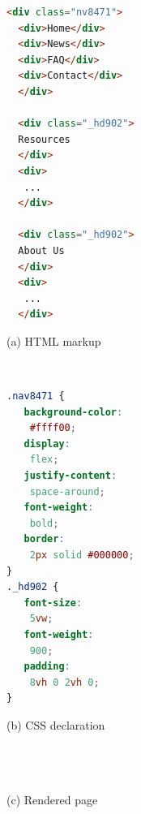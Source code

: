\begin{figure}%
	\centering
    \noindent
    \begin{minipage}[c]{.4\textwidth}
        \centering
        \begin{lstlisting}[language={html},frame=ltbr,
            aboveskip=1.0em]
  <div class="nv8471">
  <div>Home</div>
  <div>News</div>
  <div>FAQ</div>
  <div>Contact</div>
  </div>
        
  <div class="_hd902">
  Resources
  </div>
  <div>
   ...
  </div>
  
  <div class="_hd902">
  About Us
  </div>
  <div>
   ...
  </div>
        \end{lstlisting}
    	(a) HTML markup
    \end{minipage}
\  \  \  \  \  \ 
    \begin{minipage}[c]{.45\textwidth}
        \centering
        \begin{lstlisting}[language={CSS},frame=ltbr,
            aboveskip=1.0em]
.nav8471 {
   background-color:
    #ffff00;
   display:
    flex;
   justify-content:
    space-around;
   font-weight:
    bold;
   border:
    2px solid #000000;
}
._hd902 {
   font-size:
    5vw;
   font-weight:
    900;
   padding:
    8vh 0 2vh 0;
}
        \end{lstlisting}
    	(b) CSS declaration
    \end{minipage}
    \begin{minipage}[c]{.85\textwidth}
        \centering
        \ \\ \ \\ 
        \\ (c) Rendered page
    \end{minipage}
  

\end{figure}
